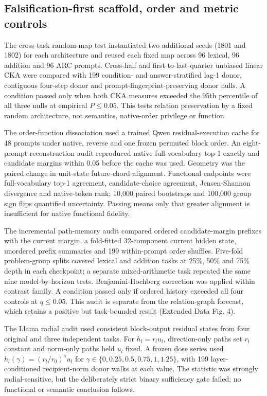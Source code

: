 \documentclass[12pt]{article}
\begin{document}
\subsection*{Falsification-first scaffold, order and metric controls}

The cross-task random-map test instantiated two additional seeds (1801 and 1802) for each architecture and reused each fixed map across 96 lexical, 96 addition and 96 ARC prompts. Cross-half and first-to-last-quarter unbiased linear CKA were compared with 199 condition- and answer-stratified lag-1 donor, contiguous four-step donor and prompt-fingerprint-preserving donor nulls. A condition passed only when both CKA measures exceeded the 95th percentile of all three nulls at empirical \(P\leq0.05\). This tests relation preservation by a fixed random architecture, not semantics, native-order privilege or function.

The order-function dissociation used a trained Qwen residual-execution cache for 48 prompts under native, reverse and one frozen permuted block order. An eight-prompt reconstruction audit reproduced native full-vocabulary top-1 exactly and candidate margins within 0.05 before the cache was used. Geometry was the paired change in unit-state future-chord alignment. Functional endpoints were full-vocabulary top-1 agreement, candidate-choice agreement, Jensen-Shannon divergence and native-token rank; 10,000 paired bootstraps and 100,000 group sign flips quantified uncertainty. Passing means only that greater alignment is insufficient for native functional fidelity.

The incremental path-memory audit compared ordered candidate-margin prefixes with the current margin, a fold-fitted 32-component current hidden state, unordered prefix summaries and 199 within-prompt order shuffles. Five-fold problem-group splits covered lexical and addition tasks at 25\%, 50\% and 75\% depth in each checkpoint; a separate mixed-arithmetic task repeated the same nine model-by-horizon tests. Benjamini-Hochberg correction was applied within contrast family. A condition passed only if ordered history exceeded all four controls at \(q\leq0.05\). This audit is separate from the relation-graph forecast, which retains a positive but task-bounded result (Extended Data Fig. 4).

The Llama radial audit used consistent block-output residual states from four original and three independent tasks. For \(h_l=r_lu_l\), direction-only paths set \(r_l\) constant and norm-only paths held \(u_l\) fixed. A frozen dose series used \(h_l(\gamma)=(r_l/r_0)^\gamma u_l\) for \(\gamma\in\{0,0.25,0.5,0.75,1,1.25\}\), with 199 layer-conditioned recipient-norm donor walks at each value. The statistic was strongly radial-sensitive, but the deliberately strict binary sufficiency gate failed; no functional or semantic conclusion follows.
\end{document}
